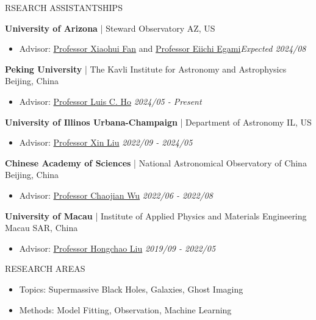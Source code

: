 \documentclass[11pt]{article} %
\begin{document}
\begin{section}{RSEARCH ASSISTANTSHIPS}

\textbf{University of Arizona} | Steward Observatory \hfill AZ, US 
\begin{itemize}[leftmargin=1.5em]
\item Advisor: \href{mailto:xfan@arizona.edu}{Professor Xiaohui Fan} and \href{mailto:egami@arizona.edu}{Professor Eiichi Egami}\hfill \textit{Expected 2024/08}
\end{itemize}

\textbf{Peking University} | The Kavli Institute for Astronomy and Astrophysics \hfill Beijing, China 
\begin{itemize}[leftmargin=1.5em]
\item Advisor: \href{mailto:lho.pku@gmail.com}{Professor Luis C. Ho} \hfill \textit{2024/05 - Present}
\end{itemize}

\textbf{University of Illinos Urbana-Champaign} | Department of Astronomy \hfill IL, US 
\begin{itemize}[leftmargin=1.5em]
\item Advisor: \href{mailto:xinliuxl@illinois.edu}{Professor Xin Liu} \hfill \textit{2022/09 - 2024/05}
\end{itemize}

\textbf{Chinese Academy of Sciences} | National Astronomical Observatory of China \hfill Beijing, China 
\begin{itemize}[leftmargin=1.5em]
\item Advisor: \href{mailto:chjwu@bao.ac.cn}{Professor Chaojian Wu} \hfill \textit{2022/06 - 2022/08} 
\end{itemize}

\textbf{University of Macau} | Institute of Applied Physics and Materials Engineering \hfill Macau SAR, China
\begin{itemize}[leftmargin=1.5em]
\item Advisor: \href{mailto:hcliu@um.edu.mo}{Professor Hongchao Liu} \hfill \textit{2019/09 - 2022/05}
\end{itemize}

\end{section}

\begin{section}{RESEARCH AREAS}

\begin{itemize}[leftmargin=1.5em]
    \item Topics: Supermassive Black Holes, Galaxies, Ghost Imaging
    \item Methods: Model Fitting, Observation, Machine Learning 
\end{itemize}

\end{section}
\end{document}
